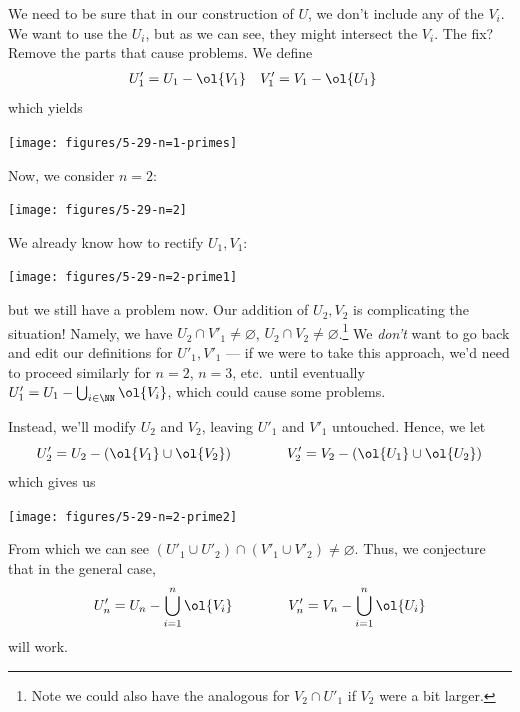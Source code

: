\documentclass{fkpset}
\begin{document}
\begin{leftbar}
\begin{center}
    \end{center}
    We need to be sure that in our construction of $U$, we don't
    include any of the $V_i$. We want to use the $U_i$, but as we can
    see, they might intersect the $V_i$. The fix? Remove the parts
    that cause problems. We define
    \begin{align*}
      U_1'
      &= U_1 - \ol{V_1}
      &
      V_1'
      &= V_1 - \ol{U_1}
    \end{align*}
    which yields
    \begin{center}
      \texttt{[image: figures/5-29-n=1-primes]}
    \end{center}
    Now, we consider $n=2$:
    \begin{center}
      \texttt{[image: figures/5-29-n=2]}
    \end{center}
    We already know how to rectify $U_1, V_1$:
    \begin{center}
      \texttt{[image: figures/5-29-n=2-prime1]}
    \end{center}
    but we still have a problem now. Our addition of $U_2, V_2$ is
    complicating the situation! Namely, we have $U_2 \cap V'_1 \neq
    \varnothing$, $U_2 \cap V_2 \neq \varnothing$.\footnote{Note we
      could also have the analogous for $V_2 \cap U'_1$ if $V_2$ were
      a bit larger.} We \emph{don't} want to go back and edit our
    definitions for $U'_1, V'_1$ --- if we were to take this approach,
    we'd need to proceed similarly for $n=2$, $n=3$, etc.\ until
    eventually $U'_1 = U_1 - \bigcup_{i\in\NN} \ol{V_i}$, which could
    cause some problems.

    Instead, we'll modify $U_2$ and $V_2$, leaving $U'_1$ and $V'_1$
    untouched. Hence, we let
    \[
      U'_2 = U_2 - (\ol{V_1} \cup \ol{V_2}) \qquad\qquad
      V'_2 = V_2 - (\ol{U_1} \cup \ol{U_2})
    \]
    which gives us
    \begin{center}
      \texttt{[image: figures/5-29-n=2-prime2]}
    \end{center}
    From which we can see $(U'_1 \cup U'_2) \cap (V'_1 \cup V'_2) \neq
    \varnothing.$ Thus, we conjecture that in the general case,
    \[
      U'_n = U_n - \bigcup_{i=1}^n \ol{V_i} \qquad\qquad V'_n = V_n -
      \bigcup_{i=1}^n \ol{U_i}
    \]
    will work.
  \end{leftbar}
  \begin{solution}

  \end{solution}
  \clearpage
\end{document}
